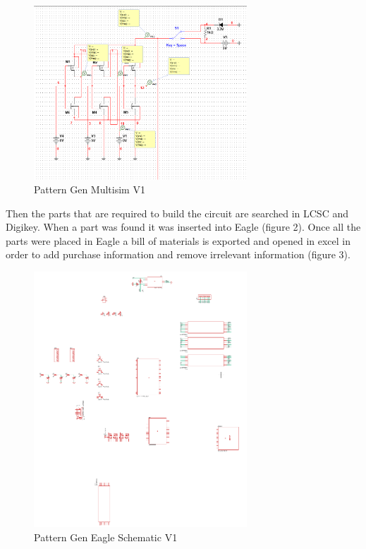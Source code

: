 \documentclass[12pt]{article}
\begin{document}
        \begin{figure}[htp]
            \centering
            \includegraphics[width=8cm]{Pattern Gen Multisim V1.png}
            \caption{Pattern Gen Multisim V1}
        \end{figure}

        \newpage

        \par Then the parts that are required to build the circuit are searched in LCSC and Digikey. When a part was found it was inserted into Eagle (figure 2). Once all the parts were placed in Eagle a bill of materials is exported and opened in excel in order to add purchase information and remove irrelevant information (figure 3).

        \begin{figure}[htp]
            \centering
            \includegraphics[width=8cm]{Pattern Gen Eagle V1.png.png}
            \caption{Pattern Gen Eagle Schematic V1}
        \end{figure}
\end{document}
